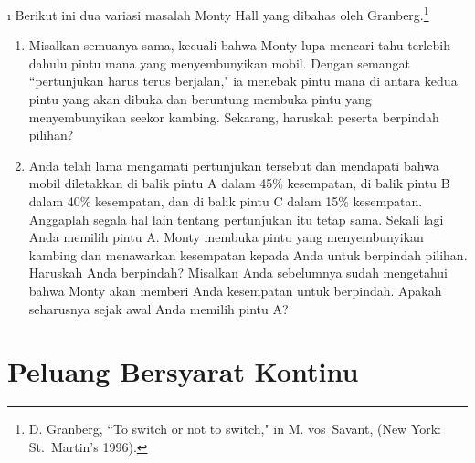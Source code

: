 \begin{LJSItem}
\i\label{exer 4.1.47} 
Berikut ini dua variasi masalah Monty Hall yang dibahas oleh Granberg.\footnote{D.
Granberg, ``To switch or not to switch," in
 M. vos~Savant, (New York: St.\ Martin's
1996).}
\begin{enumerate}
\item
Misalkan semuanya sama, kecuali bahwa Monty lupa mencari tahu terlebih dahulu pintu mana yang menyembunyikan mobil.
Dengan semangat ``pertunjukan harus terus berjalan," ia menebak pintu mana di antara kedua pintu yang akan dibuka dan
beruntung membuka pintu yang menyembunyikan seekor kambing.  Sekarang, haruskah peserta berpindah pilihan?
\item
Anda telah lama mengamati pertunjukan tersebut dan mendapati bahwa mobil diletakkan di balik pintu A dalam 45\% kesempatan,
di balik pintu B dalam 40\% kesempatan, dan di balik pintu C dalam 15\% kesempatan. Anggaplah segala hal lain
tentang pertunjukan itu tetap sama.  Sekali lagi Anda memilih pintu A. Monty membuka pintu yang menyembunyikan kambing dan
menawarkan kesempatan kepada Anda untuk berpindah pilihan. Haruskah Anda berpindah?  Misalkan Anda sebelumnya sudah mengetahui bahwa Monty akan memberi Anda
kesempatan untuk berpindah.  Apakah seharusnya sejak awal Anda memilih pintu A?
\end{enumerate}

\end{LJSItem}

\section{Peluang Bersyarat Kontinu}\label{sec 4.2}

